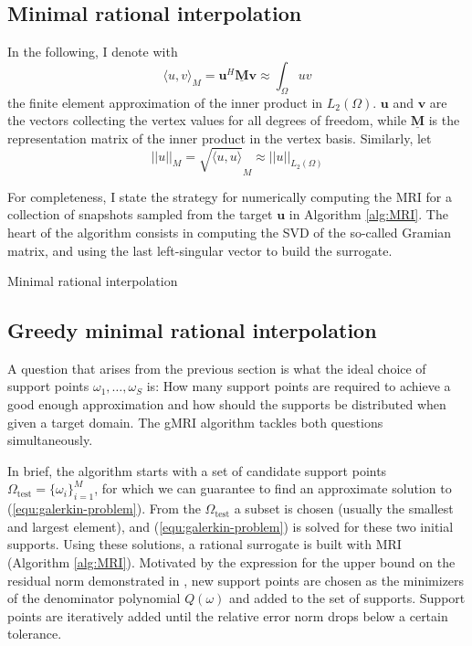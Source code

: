 \documentclass[11pt, a4paper]{article}
\begin{document}
\subsection{Minimal rational interpolation}
\label{subsec:MRI}

In the following, I denote with
\begin{equation}
    \langle u, v \rangle_M = \mathbf{u}^H \mathbf{\underline{M}} \mathbf{v} \approx \int_{\Omega} u v \label{equ:matrix-inner-product}
\end{equation}
the finite element approximation of the inner product in $L_2(\Omega)$.
$\mathbf{u}$ and $\mathbf{v}$ are the vectors collecting the vertex values for
all degrees of freedom, while $\mathbf{\underline{M}}$ is the representation matrix
of the inner product in the vertex basis. Similarly, let
\begin{equation}
    ||u||_M = \sqrt{\langle u, u \rangle}_M \approx ||u||_{L_2(\Omega)} \label{equ:matrix-norm}
\end{equation}

For completeness, I state the strategy for numerically computing the \acrfull{MRI} 
for a collection of snapshots sampled from the target $\mathbf{u}$ \citep{greedyMRI}
in Algorithm \ref{alg:MRI}. The heart of the algorithm consists in computing the
\acrfull{SVD} of the so-called Gramian matrix, and using the last
left-singular vector to build the surrogate.

\begin{algorithm}
    \caption{Minimal rational interpolation} \label{alg:MRI}
    
\end{algorithm}

\subsection{Greedy minimal rational interpolation}
\label{subsec:gMRI}

A question that arises from the previous section is what the ideal choice of
support points $\omega_1, \dots, \omega_S$ is: How many support points are
required to achieve a good enough approximation and how should the supports
be distributed when given a target domain. The \acrfull{gMRI} algorithm 
\citep{shortMRI} tackles both questions simultaneously.

In brief, the algorithm starts with a set of candidate support points
$\Omega_{\mathrm{test}} = \{\omega_i\}_{i=1}^M$, for which we can guarantee
to find an approximate solution to (\ref{equ:galerkin-problem}). 
From the $\Omega_{\mathrm{test}}$ a subset is chosen (usually the smallest and
largest element), and (\ref{equ:galerkin-problem}) is solved for these two initial
supports. Using these solutions, a rational surrogate is built with
\acrshort{MRI} (Algorithm \ref{alg:MRI}). Motivated by the expression for the
upper bound on the residual norm demonstrated in \cite{theoryMRI}, new support
points are chosen as the minimizers of the denominator polynomial $Q(\omega)$
and added to the set of supports. Support points are iteratively added until
the relative error norm drops below a certain tolerance.
\end{document}

